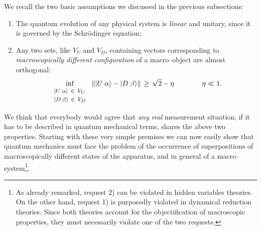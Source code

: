 \documentclass[12pt]{article}
\begin{document}
We recall the two basic assumptions we discussed in the previous
subsections:
\begin{enumerate}
\item The quantum evolution of any physical system is {\it linear}
and unitary, since it is governed by the Schr\"odinger equation;
\item Any two sets, like $V_{U}$ and $V_{D}$, containing vectors
corresponding to {\it macroscopically different configuration} of
a macro--object are almost orthogonal:
\begin{equation} \label{req4}
\inf_{\begin{array}{l}
\makebox{\footnotesize $|U\;\alpha\rangle \,\in\, V_{U}$} \\
\makebox{\footnotesize $|D\;\beta\rangle \,\in\, V_{D}$}
\end{array}}\, \| |U\;\alpha\rangle -
|D\;\beta\rangle \|\, \geq\, \sqrt{2} - \eta \qquad\qquad \eta \ll
1.
\end{equation}
\end{enumerate}
We think that everybody would agree that {\it any real}
measurement situation, if it has to be described in  quantum
mechanical terms, shares the above two properties. Starting with
these very simple premises we can now easily  show that quantum
mechanics must face the problem of the occurrence of
superpositions of macroscopically different states of the
apparatus, and in general of a macro--system\footnote{As already
remarked, request 2) can be violated in hidden variables theories.
On the other hand, request 1) is purposedly violated in dynamical
reduction theories. Since both theories account for the
objectification of macroscopic properties, they must necessarily
violate one of the two requests.}.
\end{document}
